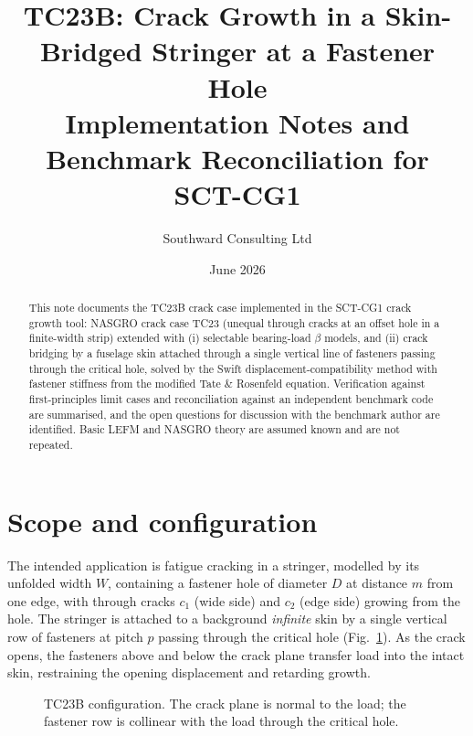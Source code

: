 \documentclass[11pt]{article}
\title{TC23B: Crack Growth in a Skin-Bridged Stringer at a Fastener Hole\\
\large Implementation Notes and Benchmark Reconciliation for SCT-CG1}
\author{Southward Consulting Ltd}
\date{June 2026}
\begin{document}
\maketitle

\begin{abstract}
This note documents the TC23B crack case implemented in the SCT-CG1 crack
growth tool: NASGRO crack case TC23 (unequal through cracks at an offset hole
in a finite-width strip) extended with (i) selectable bearing-load $\beta$
models, and (ii) crack bridging by a fuselage skin attached through a single
vertical line of fasteners passing through the critical hole, solved by the
Swift displacement-compatibility method with fastener stiffness from the
modified Tate \& Rosenfeld equation. Verification against first-principles
limit cases and reconciliation against an independent benchmark code are
summarised, and the open questions for discussion with the benchmark author
are identified. Basic LEFM and NASGRO theory are assumed known and are not
repeated.
\end{abstract}

\section{Scope and configuration}

The intended application is fatigue cracking in a stringer, modelled by its
unfolded width $W$, containing a fastener hole of diameter $D$ at distance
$m$ from one edge, with through cracks $c_1$ (wide side) and $c_2$ (edge
side) growing from the hole. The stringer is attached to a background
\emph{infinite} skin by a single vertical row of fasteners at pitch $p$
passing through the critical hole (Fig.~\ref{fig:config}). As the crack
opens, the fasteners above and below the crack plane transfer load into the
intact skin, restraining the opening displacement and retarding growth.

\begin{figure}[h]
\centering
{}
\caption{TC23B configuration. The crack plane is normal to the load; the
fastener row is collinear with the load through the critical hole.}
\label{fig:config}
\end{figure}
\end{document}
